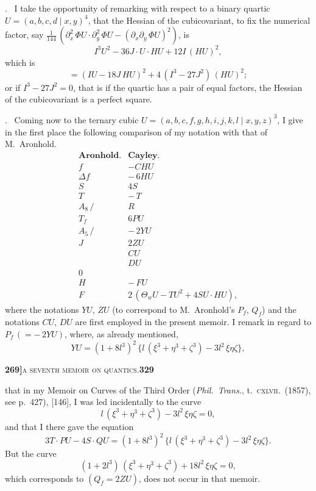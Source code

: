 \documentclass[11pt]{article}
\newcommand{\Cdel}{\mid}
\begin{document}
\medskip

. \ I take the opportunity of remarking with respect to a binary quartic $U = (a, b, c, d\Cdel x, y)^4$, that the Hessian of the cubicovariant, to fix the numerical factor, say $\tfrac{1}{144}\,(\partial_x^2\,\Phi U\cdot\partial_y^2\,\Phi U - (\partial_x\partial_y\,\Phi U)^2)$, is
\[
   I^3 U^2 - 36 J\cdot U\cdot H U + 12 I\,(H U)^2,
\]
which is
\[
   = (I U - 18 J\,H U)^2 + 4\,(I^3 - 27 J^2)\,(H U)^2;
\]
or if $I^3 - 27 J^2 = 0$, that is if the quartic has a pair of equal factors, the Hessian of the cubicovariant is a perfect square.

\medskip

. \ Coming now to the ternary cubic $U = (a, b, c, f, g, h, i, j, k, l\Cdel x, y, z)^3$, I give in the first place the following comparison of my notation with that of M.~Aronhold.
\[
\begin{array}{ll}
\textbf{Aronhold.} & \textbf{Cayley.}\\[3pt]
f & -CHU\\
\Delta f & -\,6 H U\\
S & 4 S\\
T & -\,T\\
A_8\,/ & R\\
T_f & 6 P U\\
A_5\,/ & -\,2 Y U\\
J\quad & 2 Z U\\
\quad & C U\\
\quad & D U\\
0 & \\
H & -\,F U\\
F\quad & 2\,(\Theta_w U - T U^2 + 4 S U\cdot H U),
\end{array}
\]
where the notations $Y U$, $Z U$ (to correspond to M.~Aronhold's $P_f$, $Q_f$) and the notations $C U$, $D U$ are first employed in the present memoir. I remark in regard to $P_f\,(= -\,2 Y U)$, where, as already mentioned,
\[
   Y U = (1 + 8 l^3)^2\,\{l\,(\xi^3 + \eta^3 + \zeta^3) - 3 l^2\,\xi\eta\zeta\},
\]

\newpage
\setcounter{page}{329}

\noindent\textbf{269]}\hfill\textsc{a seventh memoir on quantics.}\hfill\textbf{329}

\medskip

\noindent that in my Memoir on Curves of the Third Order (\textit{Phil.\ Trans.}, t.~\textsc{cxlvii}.\ (1857), see p.~427), [146], I was led incidentally to the curve
\[
   l\,(\xi^3 + \eta^3 + \zeta^3) - 3 l^2\,\xi\eta\zeta = 0,
\]
and that I there gave the equation
\[
   3 T\cdot P U - 4 S\cdot Q U = (1 + 8 l^3)^2\,\{l\,(\xi^3 + \eta^3 + \zeta^3) - 3 l^2\,\xi\eta\zeta\}.
\]
But the curve
\[
   (1 + 2 l^3)\,(\xi^3 + \eta^3 + \zeta^3) + 18 l^2\,\xi\eta\zeta = 0,
\]
which corresponds to $(Q_f = 2 Z U)$, does not occur in that memoir.
\end{document}
